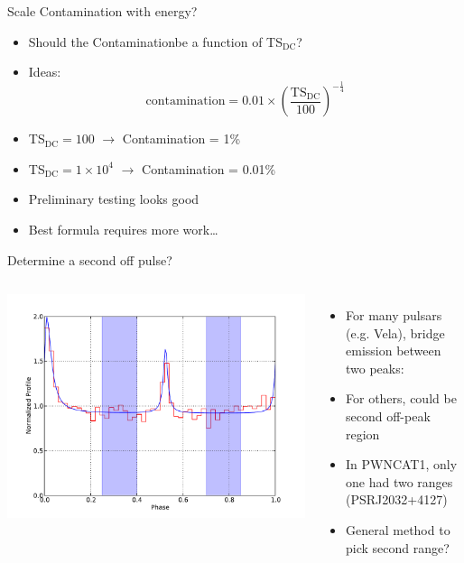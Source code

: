 \documentclass[12pt]{beamer}
\begin{document}
\begin{frame}{Scale Contamination with energy?}

  \begin{itemize}
    \item Should the Contaminationbe a function of TS$_\text{DC}$?
    \item Ideas:
      \begin{equation}
        \text{contamination} = 0.01 \times \left(\frac{\text{TS}_\text{DC}}{100}\right)^{-\tfrac{1}{4}}
      \end{equation}
    \item TS$_\text{DC}=100$ $\rightarrow$ Contamination = 1\%
    \item TS$_\text{DC}=1\times 10^4$ $\rightarrow$ Contamination = 0.01\%
    \item Preliminary testing looks good
    \item Best formula requires more work\dots
  \end{itemize}
\end{frame}

\begin{frame}{Determine a second off pulse?}
  \begin{columns}
    \includegraphics[width=1\textwidth]{plots/second_off_pulse_a.pdf}
    \begin{itemize}
      \item For many pulsars (e.g. Vela), bridge emission between two peaks:
      \item For others, could be second off-peak region 
      \item In PWNCAT1, only one had two ranges (PSRJ2032+4127)
      \item General method to pick second range?
    \end{itemize}
  \end{columns}
\end{frame}
\end{document}
